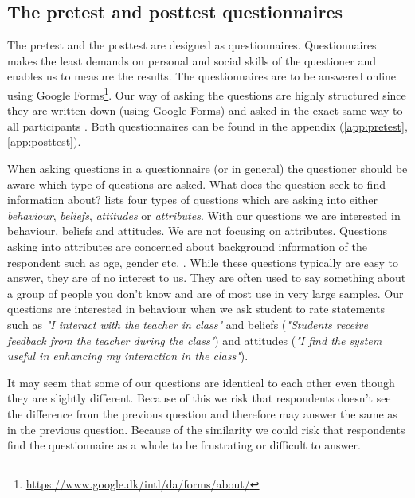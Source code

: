 \subsection{The pretest and posttest questionnaires} %
The pretest and the posttest are designed as questionnaires. Questionnaires makes the least demands on personal and social skills of the questioner \cite[p.~74]{deacon2007researching} and enables us to measure the results. The questionnaires are to be answered online using Google Forms\footnote{\url{https://www.google.dk/intl/da/forms/about/}}. Our way of asking the questions are highly structured since they are written down (using Google Forms) and asked in the exact same way to all participants \cite[p.~65]{deacon2007researching}. Both questionnaires can be found in the appendix (\ref{app:pretest}, \ref{app:posttest}).

When asking questions in a questionnaire (or in general) the questioner should be aware which type of questions are asked. What does the question seek to find information about?  lists four types of questions which are asking into either \emph{behaviour}, \emph{beliefs}, \emph{attitudes} or \emph{attributes}. With our questions we are interested in behaviour, beliefs and attitudes. We are not focusing on attributes. Questions asking into attributes are concerned about background information of the respondent such as age, gender etc. \cite[p.~75]{deacon2007researching}. While these questions typically are easy to answer, they are of no interest to us. They are often used to say something about a group of people you don't know and are of most use in very large samples. Our questions are interested in behaviour when we ask student to rate statements such as \emph{"I interact with the teacher in class"} and beliefs (\emph{"Students receive feedback from the teacher during the class"}) and attitudes (\emph{"I find the system useful in enhancing my interaction in the class"}).

It may seem that some of our questions are identical to each other even though they are slightly different. Because of this we risk that respondents doesn't see the difference from the previous question and therefore may answer the same as in the previous question. Because of the similarity we could risk that respondents find the questionnaire as a whole to be frustrating or difficult to answer.

